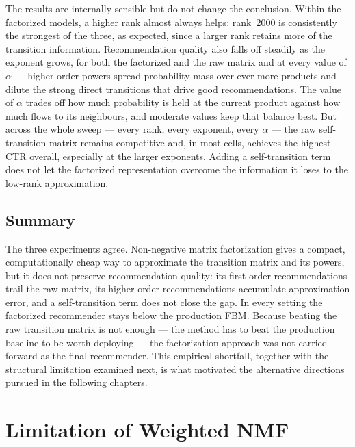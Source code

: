 The results are internally sensible but do not change the conclusion. Within the
factorized models, a higher rank almost always helps: rank~2000 is consistently
the strongest of the three, as expected, since a larger rank retains more of the
transition information. Recommendation quality also falls off steadily as the
exponent grows, for both the factorized and the raw matrix and at every value of
$\alpha$ --- higher-order powers spread probability mass over ever more products
and dilute the strong direct transitions that drive good recommendations. The
value of $\alpha$ trades off how much probability is held at the current product
against how much flows to its neighbours, and moderate values keep that balance
best. But across the whole sweep --- every rank, every exponent, every $\alpha$
--- the raw self-transition matrix remains competitive and, in most cells,
achieves the highest CTR overall, especially at the larger exponents. Adding a
self-transition term does not let the factorized representation overcome the
information it loses to the low-rank approximation.

\subsection{Summary}
\label{sec:mf-ctr-summary}

The three experiments agree. Non-negative matrix factorization gives a compact,
computationally cheap way to approximate the transition matrix and its powers,
but it does not preserve recommendation quality: its first-order recommendations
trail the raw matrix, its higher-order recommendations accumulate approximation
error, and a self-transition term does not close the gap. In every setting the
factorized recommender stays below the production FBM. Because beating the raw
transition matrix is not enough --- the method has to beat the production
baseline to be worth deploying --- the factorization approach was not carried
forward as the final recommender. This empirical shortfall, together with the
structural limitation examined next, is what motivated the alternative directions
pursued in the following chapters.

\section{Limitation of Weighted NMF}
\label{sec:wnmf-limit}

